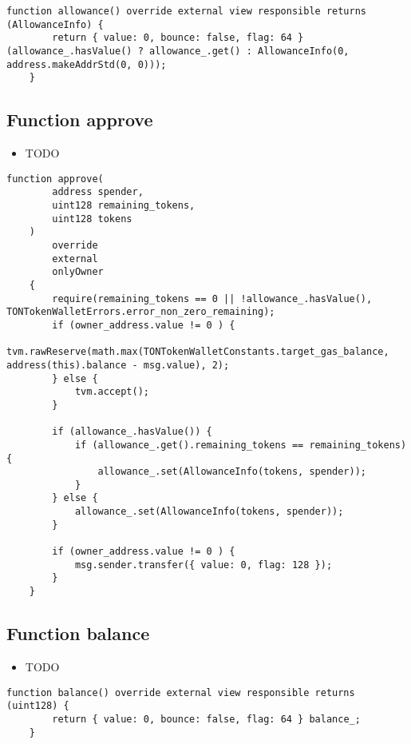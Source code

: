 \begin{lstlisting}[firstnumber=107]
    function allowance() override external view responsible returns (AllowanceInfo) {
        return { value: 0, bounce: false, flag: 64 } (allowance_.hasValue() ? allowance_.get() : AllowanceInfo(0, address.makeAddrStd(0, 0)));
    }
\end{lstlisting}

\subsection{Function approve}

\noindent\begin{itemize}
\item TODO
\end{itemize}

\begin{lstlisting}[firstnumber=119]
    function approve(
        address spender,
        uint128 remaining_tokens,
        uint128 tokens
    )
        override
        external
        onlyOwner
    {
        require(remaining_tokens == 0 || !allowance_.hasValue(), TONTokenWalletErrors.error_non_zero_remaining);
        if (owner_address.value != 0 ) {
            tvm.rawReserve(math.max(TONTokenWalletConstants.target_gas_balance, address(this).balance - msg.value), 2);
        } else {
            tvm.accept();
        }

        if (allowance_.hasValue()) {
            if (allowance_.get().remaining_tokens == remaining_tokens) {
                allowance_.set(AllowanceInfo(tokens, spender));
            }
        } else {
            allowance_.set(AllowanceInfo(tokens, spender));
        }

        if (owner_address.value != 0 ) {
            msg.sender.transfer({ value: 0, flag: 128 });
        }
    }
\end{lstlisting}

\subsection{Function balance}

\noindent\begin{itemize}
\item TODO
\end{itemize}

\begin{lstlisting}[firstnumber=58]
    function balance() override external view responsible returns (uint128) {
        return { value: 0, bounce: false, flag: 64 } balance_;
    }
\end{lstlisting}

